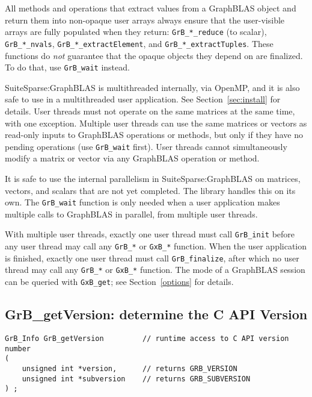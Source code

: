 \documentclass[12pt]{article}
\begin{document}
All methods and operations that extract values from a GraphBLAS object and
return them into non-opaque user arrays always ensure that the user-visible
arrays are fully populated when they return: \verb'GrB_*_reduce' (to scalar),
\verb'GrB_*_nvals', \verb'GrB_*_extractElement', and
\verb'GrB_*_extractTuples'.  These functions do {\em not} guarantee that the
opaque objects they depend on are finalized.  To do that, use
\verb'GrB_wait' instead.

SuiteSparse:GraphBLAS is multithreaded internally, via OpenMP, and it is also
safe to use in a multithreaded user application.  See Section~\ref{sec:install}
for details.
User threads must not operate on the same matrices at the same time, with one
exception.  Multiple user threads can use the same matrices or vectors as
read-only inputs to GraphBLAS operations or methods, but only if they have no
pending operations (use \verb'GrB_wait'
first).  User threads cannot simultaneously modify a matrix or vector via any
GraphBLAS operation or method.

It is safe to use the internal parallelism in SuiteSparse:GraphBLAS on
matrices, vectors, and scalars that are not yet completed.  The library
handles this on its own.  The \verb'GrB_wait' function is only
needed when a user application makes multiple calls to GraphBLAS in parallel,
from multiple user threads.

With multiple user threads, exactly one user thread must call \verb'GrB_init'
before any user thread may call any \verb'GrB_*' or \verb'GxB_*' function.
When the user application is finished, exactly one user thread must call
\verb'GrB_finalize', after which no user thread may call any \verb'GrB_*' or
\verb'GxB_*' function.
The mode of a GraphBLAS session can be queried with \verb'GxB_get';
see Section~\ref{options} for details.

\newpage
\subsection{{\sf GrB\_getVersion:} determine the C API Version} %
\label{getVersion}

\begin{mdframed}[userdefinedwidth=6in]
{\footnotesize
\begin{verbatim}
GrB_Info GrB_getVersion         // runtime access to C API version number
(
    unsigned int *version,      // returns GRB_VERSION
    unsigned int *subversion    // returns GRB_SUBVERSION
) ;
\end{verbatim}
}\end{mdframed}
\end{document}
